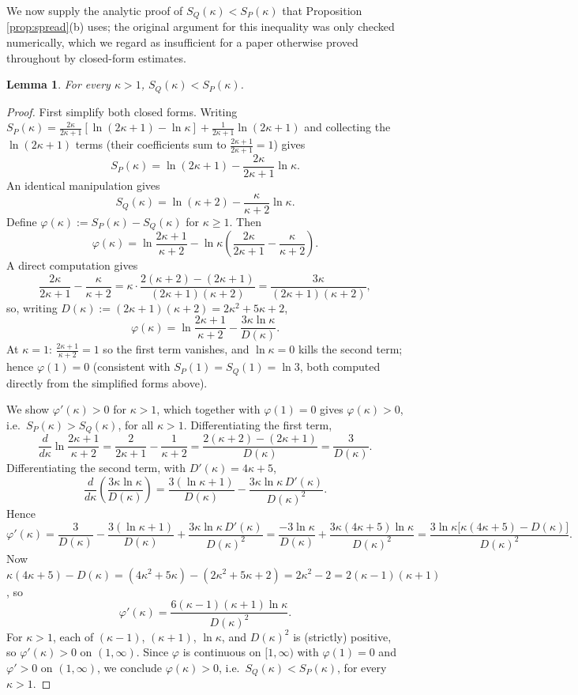 \documentclass{article}
\newtheorem{lemma}[theorem]{Lemma}
\theoremstyle{remark}
\begin{document}
We now supply the analytic proof of $S_Q(\kappa)<S_P(\kappa)$ that Proposition \ref{prop:spread}(b) uses; the original argument for this inequality was only checked numerically, which we regard as insufficient for a paper otherwise proved throughout by closed-form estimates.

\begin{lemma}\label{lem:SPSQ}
For every $\kappa>1$, $S_Q(\kappa) < S_P(\kappa)$.
\end{lemma}
\begin{proof}
First simplify both closed forms. Writing $S_P(\kappa)=\tfrac{2\kappa}{2\kappa+1}[\ln(2\kappa+1)-\ln\kappa]+\tfrac1{2\kappa+1}\ln(2\kappa+1)$ and collecting the $\ln(2\kappa+1)$ terms (their coefficients sum to $\tfrac{2\kappa+1}{2\kappa+1}=1$) gives
\[
S_P(\kappa) = \ln(2\kappa+1) - \frac{2\kappa}{2\kappa+1}\ln\kappa.
\]
An identical manipulation gives
\[
S_Q(\kappa) = \ln(\kappa+2) - \frac{\kappa}{\kappa+2}\ln\kappa.
\]
Define $\varphi(\kappa):=S_P(\kappa)-S_Q(\kappa)$ for $\kappa\ge1$. Then
\[
\varphi(\kappa) = \ln\frac{2\kappa+1}{\kappa+2} - \ln\kappa\left(\frac{2\kappa}{2\kappa+1}-\frac{\kappa}{\kappa+2}\right).
\]
A direct computation gives
\[
\frac{2\kappa}{2\kappa+1}-\frac{\kappa}{\kappa+2} = \kappa\cdot\frac{2(\kappa+2)-(2\kappa+1)}{(2\kappa+1)(\kappa+2)} = \frac{3\kappa}{(2\kappa+1)(\kappa+2)},
\]
so, writing $D(\kappa):=(2\kappa+1)(\kappa+2)=2\kappa^2+5\kappa+2$,
\[
\varphi(\kappa) = \ln\frac{2\kappa+1}{\kappa+2} - \frac{3\kappa\ln\kappa}{D(\kappa)}.
\]
At $\kappa=1$: $\tfrac{2\kappa+1}{\kappa+2}=1$ so the first term vanishes, and $\ln\kappa=0$ kills the second term; hence $\varphi(1)=0$ (consistent with $S_P(1)=S_Q(1)=\ln3$, both computed directly from the simplified forms above).

We show $\varphi'(\kappa)>0$ for $\kappa>1$, which together with $\varphi(1)=0$ gives $\varphi(\kappa)>0$, i.e.\ $S_P(\kappa)>S_Q(\kappa)$, for all $\kappa>1$. Differentiating the first term,
\[
\frac{d}{d\kappa}\ln\frac{2\kappa+1}{\kappa+2} = \frac2{2\kappa+1}-\frac1{\kappa+2} = \frac{2(\kappa+2)-(2\kappa+1)}{D(\kappa)} = \frac{3}{D(\kappa)}.
\]
Differentiating the second term, with $D'(\kappa)=4\kappa+5$,
\[
\frac{d}{d\kappa}\left(\frac{3\kappa\ln\kappa}{D(\kappa)}\right) = \frac{3(\ln\kappa+1)}{D(\kappa)} - \frac{3\kappa\ln\kappa\,D'(\kappa)}{D(\kappa)^2}.
\]
Hence
\[
\varphi'(\kappa) = \frac{3}{D(\kappa)} - \frac{3(\ln\kappa+1)}{D(\kappa)} + \frac{3\kappa\ln\kappa\,D'(\kappa)}{D(\kappa)^2}
= \frac{-3\ln\kappa}{D(\kappa)} + \frac{3\kappa(4\kappa+5)\ln\kappa}{D(\kappa)^2}
= \frac{3\ln\kappa\big[\kappa(4\kappa+5)-D(\kappa)\big]}{D(\kappa)^2}.
\]
Now $\kappa(4\kappa+5)-D(\kappa) = (4\kappa^2+5\kappa) - (2\kappa^2+5\kappa+2) = 2\kappa^2-2 = 2(\kappa-1)(\kappa+1)$, so
\[
\varphi'(\kappa) = \frac{6(\kappa-1)(\kappa+1)\ln\kappa}{D(\kappa)^2}.
\]
For $\kappa>1$, each of $(\kappa-1)$, $(\kappa+1)$, $\ln\kappa$, and $D(\kappa)^2$ is (strictly) positive, so $\varphi'(\kappa)>0$ on $(1,\infty)$. Since $\varphi$ is continuous on $[1,\infty)$ with $\varphi(1)=0$ and $\varphi'>0$ on $(1,\infty)$, we conclude $\varphi(\kappa)>0$, i.e.\ $S_Q(\kappa)<S_P(\kappa)$, for every $\kappa>1$.
\end{proof}
\end{document}
